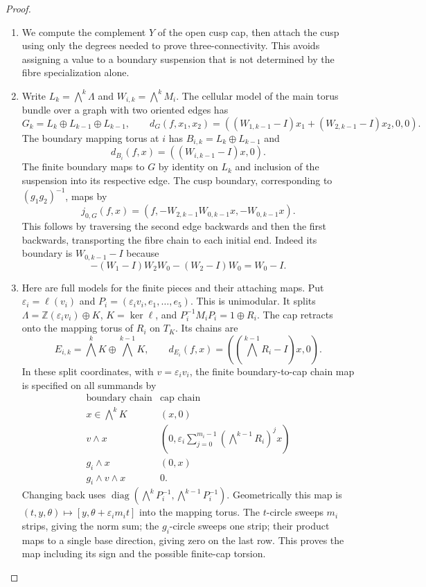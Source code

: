 \documentclass[11pt,a4paper]{article}
\theoremstyle{definition}
\begin{document}
\begin{proof}
\begin{enumerate}[label=\arabic*.]
\item We compute the complement $Y$ of the open cusp cap, then attach the
cusp using only the degrees needed to prove three-connectivity.
This avoids assigning a value to a boundary suspension that is not
determined by the fibre specialization alone.

\item Write $L_k=\bigwedge^k\Lambda$ and $W_{i,k}=\bigwedge^kM_i$.
The cellular model of the main torus bundle over a graph with two
oriented edges has
\[
G_k=L_k\oplus L_{k-1}\oplus L_{k-1},\qquad
d_G(f,x_1,x_2)=((W_{1,k-1}-I)x_1+(W_{2,k-1}-I)x_2,0,0).
\tag{1.12.1}
\]
The boundary mapping torus at $i$ has
$B_{i,k}=L_k\oplus L_{k-1}$ and
\[
d_{B_i}(f,x)=((W_{i,k-1}-I)x,0).
\tag{1.12.2}
\]
The finite boundary maps to $G$ by identity on $L_k$ and inclusion
of the suspension into its respective edge.  The cusp boundary,
corresponding to $(g_1g_2)^{-1}$, maps by
\[
j_{0,G}(f,x)=(f,-W_{2,k-1}W_{0,k-1}x,-W_{0,k-1}x).
\tag{1.12.3}
\]
This follows by traversing the second edge backwards and then the
first backwards, transporting the fibre chain to each initial end.
Indeed its boundary is $W_{0,k-1}-I$ because
\[
-(W_1-I)W_2W_0-(W_2-I)W_0=W_0-I.
\]

\item Here are full models for the finite pieces and their attaching maps.
Put $\varepsilon_i=\ell(v_i)$ and
$P_i=(\varepsilon_iv_i,e_1,\ldots,e_5)$.
This is unimodular.  It splits
$\Lambda=\mathbb Z(\varepsilon_iv_i)\oplus K$, $K=\ker\ell$,
and $P_i^{-1}M_iP_i=1\oplus R_i$.
The cap retracts onto the mapping torus of $R_i$ on $T_K$.
Its chains are
\[
E_{i,k}=\bigwedge^kK\oplus\bigwedge^{k-1}K,
\qquad d_{E_i}(f,x)=((\bigwedge^{k-1}R_i-I)x,0).
\tag{1.12.4}
\]
In these split coordinates, with $v=\varepsilon_iv_i$, the finite
boundary-to-cap chain map is specified on all summands by
\[
\begin{array}{c|c}
\text{boundary chain}&\text{cap chain}\\\hline
x\in\bigwedge^kK&(x,0)\\
v\wedge x&(0,\varepsilon_i\sum_{j=0}^{m_i-1}
                  (\bigwedge^{k-1}R_i)^jx)\\
g_i\wedge x&(0,x)\\
g_i\wedge v\wedge x&0.
\end{array}
\tag{1.12.5}
\]
Changing back uses
$\operatorname{diag}(\bigwedge^kP_i^{-1},
\bigwedge^{k-1}P_i^{-1})$.
Geometrically this map is
$(t,y,\theta)\mapsto[y,\theta+\varepsilon_im_it]$ into the mapping
torus.  The $t$-circle sweeps $m_i$ strips, giving the norm sum; the
$g_i$-circle sweeps one strip; their product maps to a single
base direction, giving zero on the last row.  This proves the map
including its sign and the possible finite-cap torsion.


\end{enumerate}
\end{proof}
\end{document}
